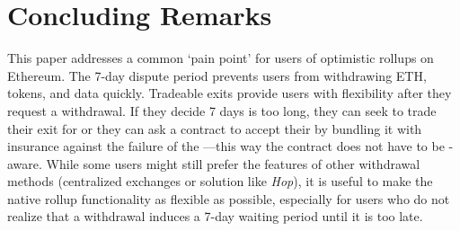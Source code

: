 





\section{Concluding Remarks}

This paper addresses a common `pain point' for users of \layertwo optimistic rollups on Ethereum. The 7-day dispute period prevents users from withdrawing ETH, tokens, and data quickly. Tradeable exits provide users with flexibility after they request a withdrawal. If they decide 7 days is too long, they can seek to trade their exit for \ethone or they can ask a contract to accept their \ethxx by bundling it with insurance against the failure of the \rblock---this way the contract does not have to be \layertwo-aware. While some users might still prefer the features of other withdrawal methods (centralized exchanges or solution like \textit{Hop}), it is useful to make the native rollup functionality as flexible as possible, especially for users who do not realize that a withdrawal induces a 7-day waiting period until it is too late. 



